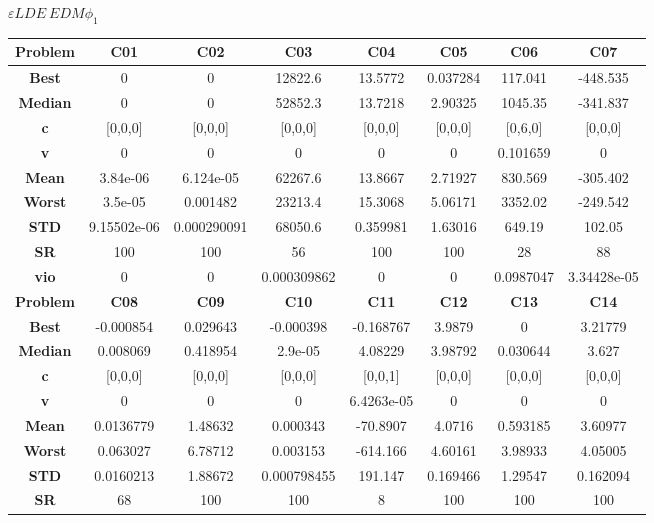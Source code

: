 \documentclass{IEEEtran}
\begin{document}
\begin{center}
$\varepsilon LDE\ EDM \phi_1$\\
  \begin{tabular}{|c|c|c|c|c|c|c|c|}
    \hline 
    \textbf{Problem} & \textbf{C01} & \textbf{C02} & \textbf{C03} & \textbf{C04} & \textbf{C05} & \textbf{C06} & \textbf{C07} \\ 
    \hline\hline 
    \textbf{Best} & 0 & 0 & 12822.6 & 13.5772 & 0.037284 & 117.041 & -448.535\\ 
    \textbf{Median} & 0 & 0 & 52852.3 & 13.7218 & 2.90325 & 1045.35 & -341.837\\ 
    \textbf{c} & [0,0,0] & [0,0,0] & [0,0,0] & [0,0,0] & [0,0,0] & [0,6,0] & [0,0,0]\\ 
    \textbf{v} & 0 & 0 & 0 & 0 & 0 & 0.101659 & 0\\ 
    \textbf{Mean} & 3.84e-06 & 6.124e-05 & 62267.6 & 13.8667 & 2.71927 & 830.569 & -305.402\\ 
    \textbf{Worst} & 3.5e-05 & 0.001482 & 23213.4 & 15.3068 & 5.06171 & 3352.02 & -249.542\\ 
    \textbf{STD} & 9.15502e-06 & 0.000290091 & 68050.6 & 0.359981 & 1.63016 & 649.19 & 102.05\\ 
    \textbf{SR} & 100 & 100 & 56 & 100 & 100 & 28 & 88\\ 
    \textbf{vio} & 0 & 0 & 0.000309862 & 0 & 0 & 0.0987047 & 3.34428e-05\\ 
    \hline 
    \hline 
    \textbf{Problem} & \textbf{C08} & \textbf{C09} & \textbf{C10} & \textbf{C11} & \textbf{C12} & \textbf{C13} & \textbf{C14} \\ 
    \hline\hline 
    \textbf{Best} & -0.000854 & 0.029643 & -0.000398 & -0.168767 & 3.9879 & 0 & 3.21779\\ 
    \textbf{Median} & 0.008069 & 0.418954 & 2.9e-05 & 4.08229 & 3.98792 & 0.030644 & 3.627\\ 
    \textbf{c} & [0,0,0] & [0,0,0] & [0,0,0] & [0,0,1] & [0,0,0] & [0,0,0] & [0,0,0]\\ 
    \textbf{v} & 0 & 0 & 0 & 6.4263e-05 & 0 & 0 & 0\\ 
    \textbf{Mean} & 0.0136779 & 1.48632 & 0.000343 & -70.8907 & 4.0716 & 0.593185 & 3.60977\\ 
    \textbf{Worst} & 0.063027 & 6.78712 & 0.003153 & -614.166 & 4.60161 & 3.98933 & 4.05005\\ 
    \textbf{STD} & 0.0160213 & 1.88672 & 0.000798455 & 191.147 & 0.169466 & 1.29547 & 0.162094\\ 
    \textbf{SR} & 68 & 100 & 100 & 8 & 100 & 100 & 100\\ 

\end{tabular}
\end{center}
\end{document}
